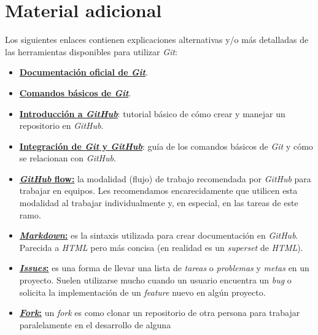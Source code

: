   \section{Material adicional}
    Los siguientes enlaces contienen explicaciones alternativas y/o más detalladas de
    las herramientas disponibles para utilizar \textit{Git}:
    
    \begin{itemize}
      \item \href{https://git-scm.com}{\textbf{Documentación oficial de 
        \textit{Git}}}.
      \item \href{https://rogerdudler.github.io/git-guide/}{\textbf{Comandos básicos 
        de \textit{Git}}}.
      \item \href{https://guides.github.com/activities/hello-world/}{
        \textbf{Introducción a \textit{GitHub}}}: tutorial básico de cómo crear y 
        manejar un repositorio en \textit{GitHub}. 
      \item \href{https://guides.github.com/introduction/git-handbook/}{
        \textbf{Integración de \textit{Git} y \textit{GitHub}}}: guía de los comandos 
        básicos de \textit{Git} y cómo se relacionan con \textit{GitHub}.
      \item \href{https://guides.github.com/introduction/flow/}{\textbf{
        \textit{GitHub} flow:}} la modalidad (flujo) de trabajo recomendada por 
        \textit{GitHub} para trabajar en equipos.
        Les recomendamos encarecidamente que utilicen esta modalidad al trabajar 
        individualmente y, en especial, en las tareas de este ramo.
      \item \href{https://guides.github.com/features/mastering-markdown/}{
        \textbf{\textit{Markdown}:}} es la sintaxis utilizada para crear documentación
        en \textit{GitHub}.
        Parecida a \textit{HTML} pero más concisa (en realidad es un \textit{superset}
        de \textit{HTML}). 
      \item \href{https://guides.github.com/features/issues/}{
        \textbf{\textit{Issues}:}} es una forma de llevar una lista de \textit{tareas}
        o \textit{problemas} y \textit{metas} en un proyecto.
        Suelen utilizarse mucho cuando un usuario encuentra un \textit{bug} o solicita
        la implementación de un \textit{feature} nuevo en algún proyecto.
      \item \href{https://guides.github.com/activities/forking/}{
        \textbf{\textit{Fork}:}} un \textit{fork} es como clonar un repositorio de 
        otra persona para trabajar paralelamente en el desarrollo de alguna 

\end{itemize}
